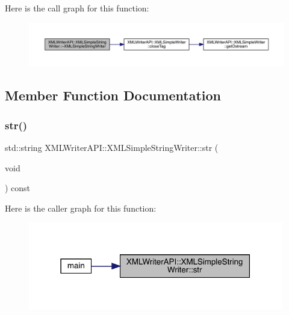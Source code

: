 Here is the call graph for this function\+:
\nopagebreak
\begin{figure}[H]
\begin{center}
\leavevmode
\includegraphics[width=350pt]{da/dec/classXMLWriterAPI_1_1XMLSimpleStringWriter_a10b08cc22793241a637eefa425e0ebe5_cgraph}
\end{center}
\end{figure}


\subsection{Member Function Documentation}
\mbox{\label{classXMLWriterAPI_1_1XMLSimpleStringWriter_ae316d9565925e9605c38eb0a14e99e90}} 
\subsubsection{\texorpdfstring{str()}{str()}\hspace{0.1cm}{\footnotesize\ttfamily [1/2]}}
{\footnotesize\ttfamily std\+::string X\+M\+L\+Writer\+A\+P\+I\+::\+X\+M\+L\+Simple\+String\+Writer\+::str (\begin{DoxyParamCaption}\item[{void}]{ }\end{DoxyParamCaption}) const\hspace{0.3cm}{\ttfamily [inline]}}

Here is the caller graph for this function\+:\nopagebreak
\begin{figure}[H]
\begin{center}
\leavevmode
\includegraphics[width=315pt]{da/dec/classXMLWriterAPI_1_1XMLSimpleStringWriter_ae316d9565925e9605c38eb0a14e99e90_icgraph}
\end{center}
\end{figure}
\mbox{\label{classXMLWriterAPI_1_1XMLSimpleStringWriter_ae316d9565925e9605c38eb0a14e99e90}} 
